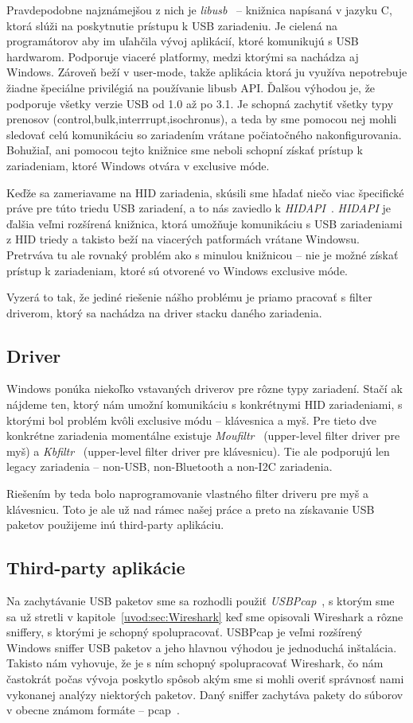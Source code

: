 Pravdepodobne najznámejšou z nich je \textit{libusb}~\cite{libusb} -- knižnica napísaná v jazyku C, ktorá slúži na poskytnutie prístupu k USB zariadeniu. Je cielená na programátorov aby im uľahčila vývoj aplikácií, ktoré komunikujú s USB hardwarom. Podporuje viaceré platformy, medzi ktorými sa nachádza aj Windows. Zároveň beží v user-mode, takže aplikácia ktorá ju využíva nepotrebuje žiadne špeciálne privilégiá na používanie libusb API. Ďalšou výhodou je, že podporuje všetky verzie USB od 1.0 až po 3.1. Je schopná zachytiť všetky typy prenosov (control,bulk,interrrupt,isochronus), a teda by sme pomocou nej mohli sledovať celú komunikáciu so zariadením vrátane počiatočného nakonfigurovania. Bohužiaľ, ani pomocou tejto knižnice sme neboli schopní získať prístup k zariadeniam, ktoré Windows otvára v exclusive móde.

Keďže sa zameriavame na HID zariadenia, skúsili sme hľadať niečo viac špecifické práve pre túto triedu USB zariadení, a to nás zaviedlo k \textit{HIDAPI}~\cite{hidapi_library}. \textit{HIDAPI} je ďalšia veľmi rozšírená knižnica, ktorá umožňuje komunikáciu s USB zariadeniami z HID triedy a takisto beží na viacerých patformách vrátane Windowsu. Pretrváva tu ale rovnaký problém ako s minulou knižnicou -- nie je možné získať prístup k zariadeniam, ktoré sú otvorené vo Windows exclusive móde.

Vyzerá to tak, že jediné riešenie nášho problému je priamo pracovať s filter driverom, ktorý sa nachádza na driver stacku daného zariadenia.

\subsection{Driver}
Windows ponúka niekoľko vstavaných driverov pre rôzne typy zariadení. Stačí ak nájdeme ten, ktorý nám umožní komunikáciu s konkrétnymi HID zariadeniami, s ktorými bol problém kvôli exclusive módu -- klávesnica a myš. Pre tieto dve konkrétne zariadenia momentálne existuje \textit{Moufiltr}~\cite{moufiltr} (upper-level filter driver pre myš) a \textit{Kbfiltr}~\cite{kbfiltr} (upper-level filter driver pre klávesnicu). Tie ale podporujú len legacy zariadenia -- non-USB, non-Bluetooth a non-I2C zariadenia.

Riešením by teda bolo naprogramovanie vlastného filter driveru pre myš a klávesnicu. Toto je ale už nad rámec našej práce a preto na získavanie USB paketov použijeme inú third-party aplikáciu.

\subsection{Third-party aplikácie}
Na zachytávanie USB paketov sme sa rozhodli použiť \textit{USBPcap}~\cite{usbpcap}, s ktorým sme sa už stretli v kapitole~\ref{uvod:sec:Wireshark} keď sme opisovali Wireshark a rôzne sniffery, s ktorými je schopný spolupracovať. USBPcap je veľmi rozšírený Windows sniffer USB paketov a jeho hlavnou výhodou je jednoduchá inštalácia. Takisto nám vyhovuje, že je s ním schopný spolupracovať Wireshark, čo nám častokrát počas vývoja poskytlo spôsob akým sme si mohli overiť správnosť nami vykonanej analýzy niektorých paketov. Daný sniffer zachytáva pakety do súborov v obecne známom formáte -- pcap~\cite{pcap}. 

